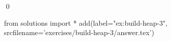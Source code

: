 
\begin{ex} 
  \label{ex:build-heap-3}
  
  \qed
\end{ex} 
\begin{python0}
from solutions import *
add(label="ex:build-heap-3",
    srcfilename='exercises/build-heap-3/answer.tex') 
\end{python0}
